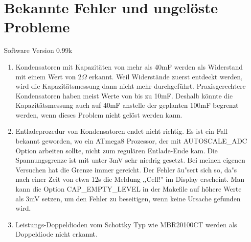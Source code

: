 
\chapter{Bekannte Fehler und ungel\"oste Probleme}
{\center Software Version 0.99k}

\begin{enumerate}
\item Kondensatoren mit Kapazit\"aten von mehr als 40mF werden als Widerstand mit einem Wert von \(2\Omega\) erkannt.
Weil Widerst\"ande zuerst entdeckt werden, wird die Kapazit\"atsmessung dann nicht mehr durchgef\"uhrt.
Praxisgerechtere Kondensatoren haben meist Werte von bis zu 10mF.
Deshalb k\"onnte die Kapazit\"atsmessung auch auf 40mF anstelle der geplanten 100mF begrenzt werden, wenn dieses Problem nicht
gel\"ost werden kann.
\item Entladeprozedur von Kondensatoren endet nicht richtig. Es ist ein Fall bekannt geworden, wo ein ATmega8 Prozessor,
der mit AUTOSCALE\_ADC Option arbeiten sollte, nicht zum regul\"aren Entlade-Ende kam.
Die Spannungsgrenze ist mit unter 3mV sehr niedrig gesetzt. Bei meinen eigenen Versuchen hat die Grenze immer gereicht.
Der Fehler \"au"sert sich so, da"s nach einer Zeit von etwa 12s die Meldung ,,Cell!'' im Display erscheint.
Man kann die Option CAP\_EMPTY\_LEVEL in der Makefile auf h\"ohere Werte als 3mV setzen, um den Fehler zu beseitigen,
wenn keine Ursache gefunden wird.
\item Leistungs-Doppeldioden vom Schottky Typ wie MBR20100CT werden als Doppeldiode nicht erkannt.

\end{enumerate}
